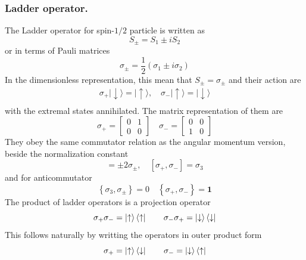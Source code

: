 \documentclass[../../../main.tex]{subfiles}
\begin{document}
\subsubsection{Ladder operator.}
The Ladder operator for spin-$1/2$ particle is written as
\begin{equation*}
    S_\pm = S_1 \pm iS_2
\end{equation*}
or in terms of Pauli matrices
\begin{equation*}
    \sigma_ \pm = \frac{1 }{2 }\left( \sigma_1 \pm i\sigma_2 \right)
\end{equation*}
In the dimensionless representation, this mean that $S_\pm=\sigma_\pm$ and their action are
\begin{gather*}
    \sigma_+ |\downarrow\rangle = |\uparrow\rangle, \quad \sigma_- |\uparrow\rangle = |\downarrow\rangle\\
\end{gather*}
with the extremal states annihilated.
The matrix representation of them are
\begin{equation*}
    \sigma_+ =
    \begin{bmatrix}
        0 & 1 \\
        0 & 0
    \end{bmatrix}
    \quad
    \sigma_- =
    \begin{bmatrix}
        0 & 0 \\
        1 & 0
    \end{bmatrix}
\end{equation*}
They obey the same commutator relation as the angular momentum version, beside the normalization constant
\begin{equation*}
    [\sigma_3, \sigma_\pm] = \pm 2 \sigma_\pm, \quad [\sigma_+, \sigma_-] = \sigma_3
\end{equation*}
and for anticommutator
\begin{equation*}
    \left\{ \sigma_3,\sigma_\pm  \right\} = 0 \quad
    \left\{\sigma_+,\sigma_-  \right\} =\mathbf{1 }
\end{equation*}
The product of ladder operators is a projection operator
\begin{equation*}
    \sigma_+ \sigma_- = \ket{\uparrow}\bra{\uparrow}\qquad
    \sigma_- \sigma_+ = \ket{\downarrow}\bra{\downarrow}
\end{equation*}
This follows naturally by writting the operators in outer product form
\begin{equation*}
    \sigma_+ = \ket{\uparrow }\bra{\downarrow} \qquad \sigma_- = \ket{\downarrow}\bra{\uparrow}
\end{equation*}
\end{document}
